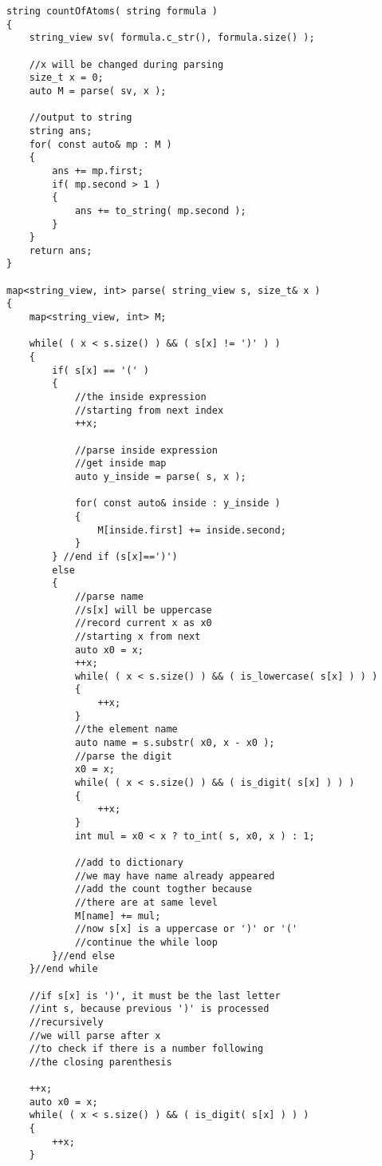 \setcounter{lstlisting}{0}
\begin{lstlisting}[style=customc, caption={Recursion}]
string countOfAtoms( string formula )
{
    string_view sv( formula.c_str(), formula.size() );

    //x will be changed during parsing
    size_t x = 0;
    auto M = parse( sv, x );

    //output to string
    string ans;
    for( const auto& mp : M )
    {
        ans += mp.first;
        if( mp.second > 1 )
        {
            ans += to_string( mp.second );
        }
    }
    return ans;
}

map<string_view, int> parse( string_view s, size_t& x )
{
    map<string_view, int> M;

    while( ( x < s.size() ) && ( s[x] != ')' ) )
    {
        if( s[x] == '(' )
        {
            //the inside expression
            //starting from next index
            ++x;

            //parse inside expression
            //get inside map
            auto y_inside = parse( s, x );

            for( const auto& inside : y_inside )
            {
                M[inside.first] += inside.second;
            }
        } //end if (s[x]==')')
        else
        {
            //parse name
            //s[x] will be uppercase
            //record current x as x0
            //starting x from next
            auto x0 = x;
            ++x;
            while( ( x < s.size() ) && ( is_lowercase( s[x] ) ) )
            {
                ++x;
            }
            //the element name
            auto name = s.substr( x0, x - x0 );
            //parse the digit
            x0 = x;
            while( ( x < s.size() ) && ( is_digit( s[x] ) ) )
            {
                ++x;
            }
            int mul = x0 < x ? to_int( s, x0, x ) : 1;

            //add to dictionary
            //we may have name already appeared
            //add the count togther because
            //there are at same level
            M[name] += mul;
            //now s[x] is a uppercase or ')' or '('
            //continue the while loop
        }//end else
    }//end while

    //if s[x] is ')', it must be the last letter
    //int s, because previous ')' is processed
    //recursively
    //we will parse after x
    //to check if there is a number following
    //the closing parenthesis

    ++x;
    auto x0 = x;
    while( ( x < s.size() ) && ( is_digit( s[x] ) ) )
    {
        ++x;
    }


\end{lstlisting}
